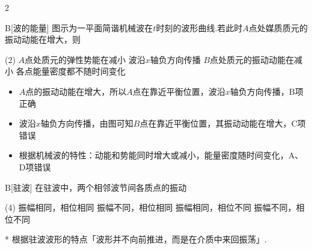 \begin{paracol}{2}
\begin{choice}{B}[波的能量]
    图示为一平面简谐机械波在$t$时刻的波形曲线.若此时$A$点处媒质质元的振动动能在增大，则
    \begin{tasks}(2)
        \task $A$点处质元的弹性势能在减小
        \task 波沿$x$轴负方向传播
        \task $B$点处质元的振动动能在减小
        \task 各点能量密度都不随时间变化
    \end{tasks}
\end{choice}
\switchcolumn\centering
\vfill
\vfill
\end{paracol}
\begin{solution}
    \begin{itemize}
        \item $A$点的振动动能在增大，所以$A$点在靠近平衡位置，波沿$x$轴负方向传播，B项正确
        \item 波沿$x$轴负方向传播，由图可知$B$点在靠近平衡位置，其振动动能在增大，C项错误
        \item 根据机械波的特性：动能和势能同时增大或减小，能量密度随时间变化，A、D项错误
    \end{itemize}
\end{solution}

\begin{choice}{B}[驻波]
    在驻波中，两个相邻波节间各质点的振动
    \begin{tasks}(4)
        \task 振幅相同，相位相同
        \task 振幅不同，相位相同
        \task 振幅相同，相位不同
        \task 振幅不同，相位不同
    \end{tasks}    
\end{choice}
\begin{solution}*
    根据驻波波形的特点「波形并不向前推进，而是在介质中来回振荡」.
\end{solution}


